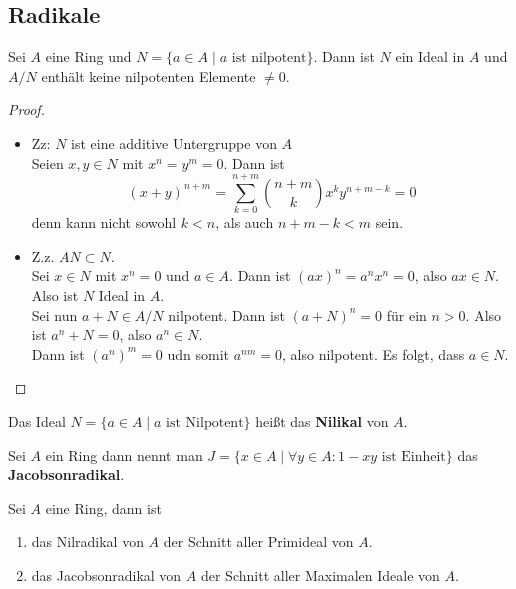 	\subsection{Radikale}
	\begin{satz}
		Sei $A$ eine Ring und $N=\{a\in A\mid \text{$a$ ist nilpotent}\}$. Dann ist $N$ ein Ideal in $A$ und $A/N$ enthält keine nilpotenten Elemente $\neq 0$.
	\end{satz}
	\begin{proof}
		\begin{itemize}
			\item Zz: $N$ ist eine additive Untergruppe von $A$\\
			Seien $x,y\in N$ mit $x^n=y^m=0$. Dann ist
			\[(x+y)^{n+m}=\sum_{k=0}^{n+m}\binom{n+m}{k}x^ky^{n+m-k}=0\]
			denn kann nicht sowohl $k<n$, als auch $n+m-k<m$ sein.
			\item Z.z. $AN\subset N$.\\
			Sei $x\in N$ mit $x^n=0$ und $a\in A$.
			Dann ist $(ax)^n=a^nx^n=0$, also $ax\in N$.\\
			Also ist $N$ Ideal in $A$.\\
			Sei nun $a+N\in A/N$ nilpotent. Dann ist $(a+N)^n=0$ für ein $n>0$. Also ist $a^n+N=0$, also $a^n\in N$.\\
			Dann ist $(a^n)^m=0$ udn somit $a^{nm}=0$, also nilpotent. Es folgt, dass $a\in N$.
		\end{itemize}
	\end{proof}

	\begin{definition}
		Das Ideal $N=\{a\in A\mid\text{$a$ ist Nilpotent}\}$ heißt das \textbf{Nilikal} von $A$.
	\end{definition}

	\begin{definition}
		Sei $A$ ein Ring dann nennt man $J=\{x\in A\mid \forall y\in A:\text{$1-xy$ ist Einheit}\}$ das \textbf{Jacobsonradikal}.
	\end{definition}

	\begin{satz}
		Sei $A$ eine Ring, dann ist 
		\begin{enumerate}
			\item das Nilradikal von $A$ der Schnitt aller Primideal von $A$.
			\item das Jacobsonradikal von $A$ der Schnitt aller Maximalen Ideale von $A$.
		\end{enumerate}
	\end{satz}

